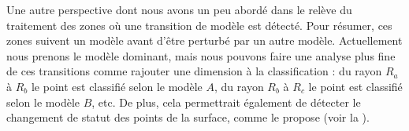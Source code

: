 Une autre perspective dont nous avons un peu abordé dans le
 relève du traitement des
zones où une transition de modèle est détecté. Pour résumer, ces zones suivent
un modèle avant d'être perturbé par un autre modèle. Actuellement nous prenons
le modèle dominant, mais nous pouvons faire une analyse plus fine de ces
transitions comme rajouter une dimension à la classification : du rayon $R_a$ à
$R_b$ le point est classifié selon le modèle $A$, du rayon $R_b$ à $R_c$ le
point est classifié selon le modèle $B$, etc. De plus, cela permettrait
également de détecter le changement de statut des points de la surface, comme le
propose  (voir la
).

%

%
%
%
%
%
